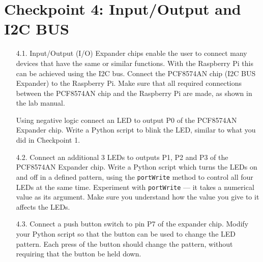 \newpage
\section{Checkpoint 4: Input/Output and I2C BUS}

\begin{enumerate}


\item [4.1.] Input/Output (I/O) Expander chips enable the user to connect many devices that have the same or similar functions.
With the Raspberry Pi this can be achieved using the I2C bus.
Connect the PCF8574AN chip  (I2C BUS Expander) to the Raspberry Pi.
Make sure that all required connections between the PCF8574AN chip and the Raspberry Pi are made, as shown in the lab manual.

Using negative logic connect an LED to output P0 of the PCF8574AN Expander chip. 
Write a Python script to blink the LED, similar to what you did in Checkpoint 1.





\item [4.2.] Connect an additional 3 LEDs to outputs P1, P2 and P3 of the PCF8574AN Expander chip.
Write a Python script which turns the LEDs on and off in a defined pattern, using the \texttt{portWrite} method to control all four LEDs at the same time.
Experiment with \texttt{portWrite} --- it takes a numerical value as its argument.
Make sure you understand how the value you give to it affects the LEDs.


\item [4.3.] Connect a push button switch to pin P7 of the expander chip.
Modify your Python script so that the button can be used to change the LED pattern.
Each press of the button should change the pattern, without requiring that the button be held down.



\end{enumerate}

